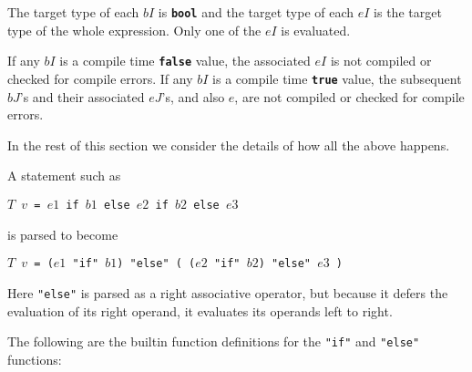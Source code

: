 \documentclass[12pt]{article}
\newcommand{\TT}[1]{{\tt \bfseries #1}}
\begin{document}
The target type of each $bI$ is \TT{bool} and the target type of each
$eI$ is the target type of the whole expression.
Only one of the $eI$ is evaluated.

If any $bI$ is a compile time
\TT{false} value, the associated $eI$ is not compiled or checked
for compile errors.
If any $bI$ is a compile time
\TT{true} value, the subsequent $bJ$'s and their associated $eJ$'s,
and also $e$,
are not compiled or checked
for compile errors.

In the rest of this section we consider the details of
how all the above happens.

A statement such as
\begin{center}
\tt $T$ $v$ = $e1$ if $b1$ else $e2$ if $b2$ else $e3$
\end{center}
is parsed to become
\begin{center}
\tt $T$ $v$ = ($e1$ "if" $b1$) "else" ( ($e2$ "if" $b2$) "else" $e3$ )
\end{center}

Here {\tt "else"} is parsed as a right associative operator,
but because it defers the evaluation of its right operand,
it evaluates its operands left to right.

The following are the builtin function definitions for
the {\tt "if"} and {\tt "else" } functions:
\end{document}
